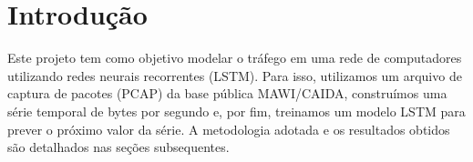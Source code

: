 \section{Introdução}

Este projeto tem como objetivo modelar o tráfego em uma rede de computadores utilizando redes neurais
recorrentes (LSTM). Para isso, utilizamos um arquivo de captura de pacotes (PCAP) da base pública MAWI/CAIDA,
construímos uma série temporal de bytes por segundo e, por fim, treinamos um modelo LSTM para prever o
próximo valor da série.
A metodologia adotada e os resultados obtidos são detalhados nas seções subsequentes.
